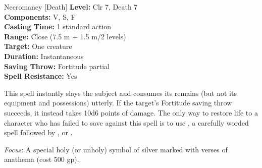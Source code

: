 {Necromancy [Death]}
{
	\textbf{Level:}
	Clr 7, Death 7\\
	\textbf{Components:}
	V, S, F\\
	\textbf{Casting Time:}
	1 standard action\\
	\textbf{Range:}
	Close (7.5 m + 1.5 m/2 levels)\\
	\textbf{Target:}
	One creature\\
	\textbf{Duration:}
	Instantaneous\\
	\textbf{Saving Throw:}
	Fortitude partial\\
	\textbf{Spell Resistance:}
	Yes\\
}
{
	This spell instantly slays the subject and consumes its remains (but not its equipment and possessions) utterly. If the target's Fortitude saving throw succeeds, it instead takes 10d6 points of damage. The only way to restore life to a character who has failed to save against this spell is to use , a carefully worded  spell followed by , or .

	\textit{Focus}:
	A special holy (or unholy) symbol of silver marked with verses of anathema (cost 500 gp).

}
